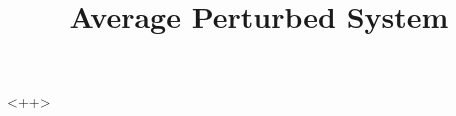 \documentclass[12pt,reqno]{amsart}
\title{Average Perturbed System}
\theoremstyle{definition}
\numberwithin{equation}{section}
\begin{document}
<++>
\end{document}
